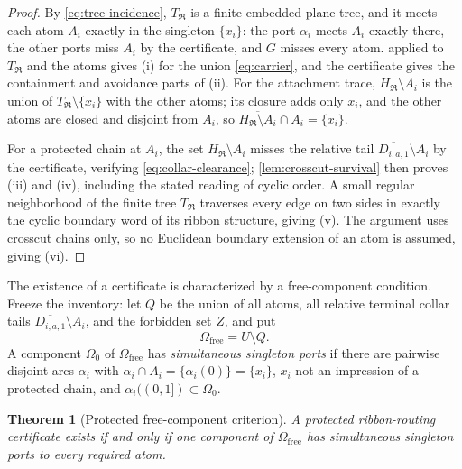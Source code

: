 \documentclass[11pt,reqno]{amsart}
\numberwithin{equation}{section}
\theoremstyle{plain}
\newtheorem{theorem}{Theorem}[section]
\theoremstyle{definition}
\theoremstyle{remark}
\begin{document}
\begin{proof}
By \eqref{eq:tree-incidence}, $T_{\mathfrak R}$ is a finite embedded
plane tree, and it meets each atom $A_i$ exactly in the singleton
$\{x_i\}$: the port $\alpha_i$ meets $A_i$ exactly there, the other
ports miss $A_i$ by the certificate, and $G$ misses every atom.
 applied to $T_{\mathfrak R}$ and the
atoms gives (i) for the union \eqref{eq:carrier}, and the certificate
gives the containment and avoidance parts of (ii).  For the attachment
trace, $H_{\mathfrak R}\setminus A_i$ is the union of
$T_{\mathfrak R}\setminus\{x_i\}$ with the other atoms; its closure
adds only $x_i$, and the other atoms are closed and disjoint from
$A_i$, so $\overline{H_{\mathfrak R}\setminus A_i}\cap A_i=\{x_i\}$.

For a protected chain at $A_i$, the set
$H_{\mathfrak R}\setminus A_i$ misses the relative tail
$\overline{D_{i,a,1}}\setminus A_i$ by the certificate, verifying
\eqref{eq:collar-clearance}; \cref{lem:crosscut-survival} then proves
(iii) and (iv), including the stated reading of cyclic order.  A small
regular neighborhood of the finite tree $T_{\mathfrak R}$ traverses
every edge on two sides in exactly the cyclic boundary word of its
ribbon structure, giving (v).  The argument uses crosscut chains only,
so no Euclidean boundary extension of an atom is assumed, giving (vi).
\end{proof}

The existence of a certificate is characterized by a free-component
condition.  Freeze the inventory: let $Q$ be the union of all atoms,
all relative terminal collar tails
$\overline{D_{i,a,1}}\setminus A_i$, and the forbidden set $Z$, and put
\begin{equation}
 \Omega_{\mathrm{free}}=U\setminus Q .
\label{eq:free-domain}
\end{equation}
A component $\Omega_0$ of $\Omega_{\mathrm{free}}$ has
\emph{simultaneous singleton ports} if there are pairwise disjoint arcs
$\alpha_i$ with $\alpha_i\cap A_i=\{\alpha_i(0)\}=\{x_i\}$, $x_i$ not an
impression of a protected chain, and
$\alpha_i((0,1])\subset\Omega_0$.

\begin{theorem}[Protected free-component criterion]
\label{thm:free-component}
A protected ribbon-routing certificate exists if and only if one
component of $\Omega_{\mathrm{free}}$ has simultaneous singleton ports
to every required atom.
\end{theorem}
\end{document}
